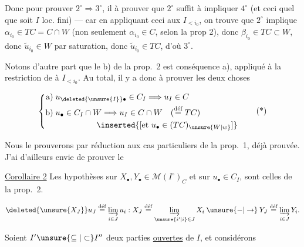 
Donc pour prouver $2^\circ\Rightarrow3^\circ$, il  à prouver que $2^\circ$  suffit à impliquer $4^\circ$ (et ceci quel que soit $I$  loc. fini) --- car en appliquant ceci aux $I_{<i_0}$, on trouve que $2^\circ$ implique $\alpha_{i_0}\in TC=C\cap W$ (non seulement $\alpha_{i_0}\in C$, selon la prop 2), donc $\beta_{i_0}\in TC\subset W$, donc $\widetilde u_{i_0}\in W$ par saturation, donc $\widetilde u_{i_0}\in TC$, d’où $3^\circ$.

Notons d’autre part que le b) de la prop.~2  est conséquence  a), appliqué  à la restriction de  à $I_{<i_0}$. Au total, il y a donc à prouver  les deux choses

\[
\left\{\begin{aligned}
 \text{a)}\;&u_{\deleted{\unsure{I}}\bullet}\in C_I\Longrightarrow u_I\in C\\
 \text{b)}\;&u_\bullet\in C_I\cap W\Longrightarrow u_I\in C\cap W\quad(\overset{\text{déf}}{=}TC)\\
 &\hspace{5em}\inserted{[\text{et }u_\bullet\in(TC)_{\unsure{W|w}}]}
\end{aligned}\right. \tag*{(*)}
\]

Nous le prouverons par réduction  aux cas particuliers de la prop.~1, déjà prouvée. J’ai d’ailleurs  envie de prouver le

\uline{Corollaire 2} Les hypothèses  sur $X_\bullet,Y_\bullet\in\mathcal M(I^\circ)_C$ et sur $u_\bullet\in C_I$,  sont celles de la prop.~2.   

\[
 \deleted{\unsure{X_J}}u_J\overset{\text{déf}}{=}\underset{i\in J}{\underrightarrow{\lim}}\,u_i:
 X_J\overset{\text{déf}}{=}\underset{\unsure{i'|i}\in J}{\underrightarrow{\lim}}\,X_i
 \mathbin{\unsure{-|\to}} Y_J\overset{\text{déf}}{=}\underset{i\in J}{\underrightarrow{\lim}}\,Y_i .
\]

Soient $I'\unsure{\subseteq|\subset} I''$ deux parties \uline{ouvertes} de $I$, et considérons  

